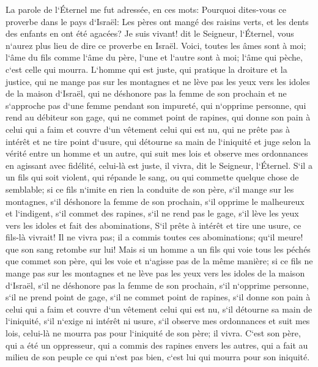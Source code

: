 \verse La parole de l`Éternel me fut adressée, en ces mots: 
\verse Pourquoi dites-vous ce proverbe dans le pays d`Israël: Les pères ont mangé des raisins verts, et les dents des enfants en ont été agacées? 
\verse Je suis vivant! dit le Seigneur, l`Éternel, vous n`aurez plus lieu de dire ce proverbe en Israël. 
\verse Voici, toutes les âmes sont à moi; l`âme du fils comme l`âme du père, l`une et l`autre sont à moi; l`âme qui pèche, c`est celle qui mourra. 
\verse L`homme qui est juste, qui pratique la droiture et la justice, 
\verse qui ne mange pas sur les montagnes et ne lève pas les yeux vers les idoles de la maison d`Israël, qui ne déshonore pas la femme de son prochain et ne s`approche pas d`une femme pendant son impureté, 
\verse qui n`opprime personne, qui rend au débiteur son gage, qui ne commet point de rapines, qui donne son pain à celui qui a faim et couvre d`un vêtement celui qui est nu, 
\verse qui ne prête pas à intérêt et ne tire point d`usure, qui détourne sa main de l`iniquité et juge selon la vérité entre un homme et un autre, 
\verse qui suit mes lois et observe mes ordonnances en agissant avec fidélité, celui-là est juste, il vivra, dit le Seigneur, l`Éternel. 
\verse S`il a un fils qui soit violent, qui répande le sang, ou qui commette quelque chose de semblable; 
\verse si ce fils n`imite en rien la conduite de son père, s`il mange sur les montagnes, s`il déshonore la femme de son prochain, 
\verse s`il opprime le malheureux et l`indigent, s`il commet des rapines, s`il ne rend pas le gage, s`il lève les yeux vers les idoles et fait des abominations, 
\verse S`il prête à intérêt et tire une usure, ce fils-là vivrait! Il ne vivra pas; il a commis toutes ces abominations; qu`il meure! que son sang retombe sur lui! 
\verse Mais si un homme a un fils qui voie tous les péchés que commet son père, qui les voie et n`agisse pas de la même manière; 
\verse si ce fils ne mange pas sur les montagnes et ne lève pas les yeux vers les idoles de la maison d`Israël, s`il ne déshonore pas la femme de son prochain, 
\verse s`il n`opprime personne, s`il ne prend point de gage, s`il ne commet point de rapines, s`il donne son pain à celui qui a faim et couvre d`un vêtement celui qui est nu, 
\verse s`il détourne sa main de l`iniquité, s`il n`exige ni intérêt ni usure, s`il observe mes ordonnances et suit mes lois, celui-là ne mourra pas pour l`iniquité de son père; il vivra. 
\verse C`est son père, qui a été un oppresseur, qui a commis des rapines envers les autres, qui a fait au milieu de son peuple ce qui n`est pas bien, c`est lui qui mourra pour son iniquité. 
